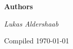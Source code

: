 \cleardoublepage
\begin{titlepage}
	\centering
	\vspace{3cm}
	{\Huge\sffamily\bfseries Authors \par} \vspace{0.5cm}
	{\itshape Lukas Aldershaab\par}
	\vfill
	{Compiled \today\par}
\end{titlepage}